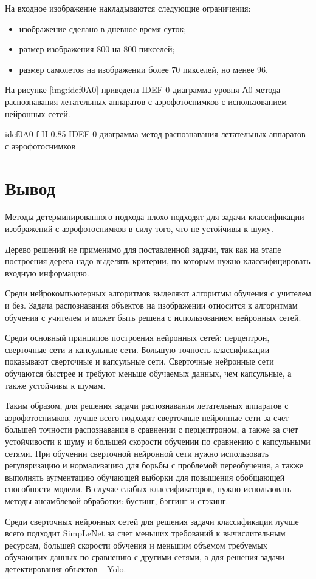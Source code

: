 На входное изображение накладываются следующие ограничения:
\begin{itemize}
	\item изображение сделано в дневное время суток;
	\item размер изображения 800 на 800 пикселей;
	\item размер самолетов на изображении более 70 пикселей, но менее 96.
\end{itemize}

На рисунке \ref{img:idef0A0} приведена IDEF-0 диаграмма уровня А0 метода распознавания летательных аппаратов с аэрофотоснимков с использованием нейронных сетей.

{idef0A0} %
{f} %
{H} %
{0.85\textwidth} %
{IDEF-0 диаграмма метод распознавания летательных аппаратов с аэрофотоснимков} %

\section{Вывод}

Методы детерминированного подхода плохо подходят для задачи классификации изображений с аэрофотоснимков в силу того, что не устойчивы к шуму.

Дерево решений не применимо для поставленной задачи, так как на этапе построения дерева надо выделять критерии, по которым нужно классифицировать входную информацию.

Среди нейрокомпьютерных алгоритмов выделяют алгоритмы обучения с учителем и без. Задача распознавания объектов на изображении относится к алгоритмам обучения с учителем и может быть решена с использованием нейронных сетей.

Среди основный принципов построения нейронных сетей: перцептрон, сверточные сети и капсульные сети. Большую точность классификации показывают сверточные и капсульные сети. Сверточные нейронные сети обучаются быстрее и требуют меньше обучаемых данных, чем капсульные, а также устойчивы к шумам.

Таким образом, для решения задачи распознавания летательных аппаратов с аэрофотоснимков, лучше всего подходят сверточные нейронные сети за счет большей точности распознавания в сравнении с перцептроном, а также за счет устойчивости к шуму и большей скорости обучении по сравнению с капсульными сетями. При обучении сверточной нейронной сети нужно использовать регуляризацию и нормализацию для борьбы с проблемой переобучения, а также выполнять аугментацию обучающей выборки для повышения обобщающей способности модели. В случае слабых классификаторов, нужно использовать методы ансамблевой обработки: бустинг, бэггинг и стэкинг.

Среди сверточных нейронных сетей для решения задачи классификации лучше всего подходит SimpLeNet за счет меньших требований к вычислительным ресурсам, большей скорости обучения и меньшим объемом требуемых обучающих данных по сравнению с другими сетями, а для решения задачи детектирования объектов -- Yolo.